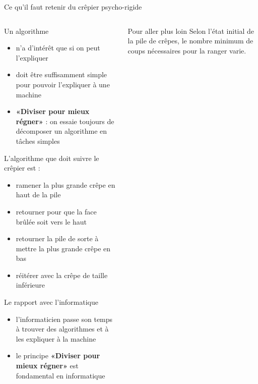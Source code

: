 \begin{frame}{Ce qu'il faut retenir du  crêpier psycho-rigide}

  \begin{columns}
    \begin{column}{.7\linewidth}
      \begin{block}{Un algorithme}
        \begin{itemize}
        \item n'a d'intérêt que si on peut l'expliquer
        \item doit être suffisamment simple pour pouvoir l'expliquer à une machine
        \item \alert{\textbf{«Diviser pour mieux régner»}} : on essaie toujours de décomposer un algorithme en tâches simples
        \end{itemize}
      \end{block}

      \begin{block}{L'algorithme que doit suivre le crêpier est :}
        \begin{itemize}
        \item ramener la plus grande crêpe en haut de la pile
        \item retourner pour que la face brûlée soit vers le haut
        \item retourner la pile de sorte à mettre la plus grande crêpe en bas
        \item réitérer avec la crêpe de taille inférieure
        \end{itemize}
      \end{block}

      \begin{block}{Le rapport avec l'informatique}
        \begin{itemize}
        \item l'informaticien passe son temps à trouver des algorithmes et  à les expliquer à la machine
        \item le principe \alert{\textbf{«Diviser pour mieux régner»}} est fondamental en informatique
        \end{itemize}
      \end{block}
    \end{column}

    \begin{column}{.3\linewidth}
      \begin{block}{Pour aller plus loin}
        Selon l'état initial de la pile de crêpes, le nombre minimum de coups nécessaires pour la ranger varie.


\end{block}
\end{column}
\end{columns}
\end{frame}
